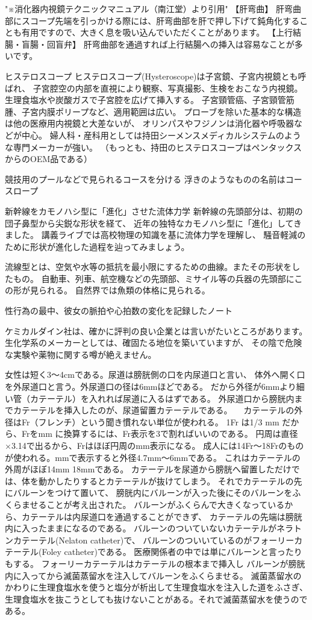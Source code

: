 "※消化器内視鏡テクニックマニュアル（南江堂）より引用"
【肝弯曲】
肝弯曲部にスコープ先端を引っかける際には、肝弯曲部を肝で押し下げて鈍角化することも有用ですので、大きく息を吸い込んでいただくことがあります。
【上行結腸・盲腸・回盲弁】
肝弯曲部を通過すれば上行結腸への挿入は容易なことが多いです。




ヒステロスコープ
ヒステロスコープ(Hysteroscope)は子宮鏡、子宮内視鏡とも呼ばれ、
子宮腔空の内部を直視により観察、写真撮影、生検をおこなう内視鏡。
生理食塩水や炭酸ガスで子宮腔を広げて挿入する。
子宮頸管癌、子宮頸管筋腫、子宮内膜ポリープなど、適用範囲は広い。
プローブを除いた基本的な構造は他の医療用内視鏡と大差ないが、
オリンパスやフジノンは消化器や呼吸器などが中心。
婦人科・産科用としては持田シーメンスメディカルシステムのような専門メーカーが強い。
（もっとも、持田のヒステロスコープはペンタックスからのOEM品である）


競技用のプールなどで見られるコースを分ける
浮きのようなものの名前はコースロープ

新幹線をカモノハシ型に「進化」させた流体力学
新幹線の先頭部分は、初期の団子鼻型から尖鋭な形状を経て、
近年の独特なカモノハシ型に「進化」してきました。
講義ライブでは高校物理の知識を基に流体力学を理解し、
騒音軽減のために形状が進化した過程を辿ってみましょう。

流線型とは、空気や水等の抵抗を最小限にするための曲線。またその形状をしたもの。
自動車、列車、航空機などの先頭部、ミサイル等の兵器の先頭部にこの形が見られる。
自然界では魚類の体格に見られる。

性行為の最中、彼女の脈拍や心拍数の変化を記録したノート


ケミカルダイン社は、確かに評判の良い企業とは言いがたいところがあります。
生化学系のメーカーとしては、確固たる地位を築いていますが、
その陰で危険な実験や薬物に関する噂が絶えません。

女性は短く3～4cmである。尿道は膀胱側の口を内尿道口と言い、
体外へ開く口を外尿道口と言う。外尿道口の径は6mmほどである。
だから外径が6mmより細い管（カテーテル）を入れれば尿道に入るはずである。
外尿道口から膀胱内までカテーテルを挿入したのが、尿道留置カテーテルである。 
　カテーテルの外径はFr（フレンチ）という聞き慣れない単位が使われる。
1Fr は1/3 mm だから、Frをmm に換算するには、Fr表示を3で割ればいいのである。
円周は直径×3.14で出るから、Frはほぼ円周のmm表示になる。
成人には14Fr～18Frのものが使われる。mmで表示すると外径4.7mm～6mmである。
これはカテーテルの外周がほぼ14mm 18mmである。
カテーテルを尿道から膀胱へ留置しただけでは、体を動かしたりするとカテーテルが抜けてしまう。
それでカテーテルの先にバルーンをつけて置いて、
膀胱内にバルーンが入った後にそのバルーンをふくらませることが考え出された。 
バルーンがふくらんで大きくなっているから、カテーテルは内尿道口を通過することができず、
カテーテルの先端は膀胱内に入ったままになるのである。
バルーンのついていないカテーテルがネラトンカテーテル(Nelaton catheter)で、
バルーンのついいているのがフォーリーカテーテル(Foley catheter)である。
医療関係者の中では単にバルーンと言ったりもする。
フォーリーカテーテルはカテーテルの根本まで挿入し
バルーンが膀胱内に入ってから滅菌蒸留水を注入してバルーンをふくらませる。
滅菌蒸留水のかわりに生理食塩水を使うと塩分が析出して生理食塩水を注入した道をふさぎ、
生理食塩水を抜こうとしても抜けないことがある。それで滅菌蒸留水を使うのである。

